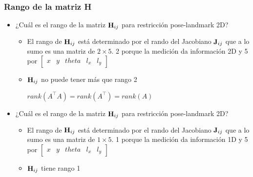 \begin{frame}
    \frametitle{Rango de la matriz H}
    \begin{itemize}
		\item ¿Cuál es el rango de la matriz $\boldsymbol{\mathbf{H}}_{ij}$ para restricción pose-landmark 2D?
		\begin{itemize}
			\item El rango de $\boldsymbol{\mathbf{H}}_{ij}$ está determinado por el rando del Jacobiano $\boldsymbol{\mathbf{J}}_{ij}$ que a lo sumo es una matriz de $2 \times 5$. 2 porque la medición da información 2D y 5 por $\begin{bmatrix}	x & y & theta & l_{x} & l_{y} \end{bmatrix}$
			\item $\boldsymbol{\mathbf{H}}_{ij}$ no puede tener más que rango 2
			
				$rank(A^{\top} A) = rank(A^{\top}) = rank(A)$
		\end{itemize}
	
		\item ¿Cuál es el rango de la matriz $\boldsymbol{\mathbf{H}}_{ij}$ para restricción pose-landmark 2D?
		\begin{itemize}
			\item El rango de $\boldsymbol{\mathbf{H}}_{ij}$ está determinado por el rando del Jacobiano $\boldsymbol{\mathbf{J}}_{ij}$ que a lo sumo es una matriz de $1 \times 5$. 1 porque la medición da información 1D y 5 por $\begin{bmatrix}	x & y & theta & l_{x} & l_{y} \end{bmatrix}$
			\item $\boldsymbol{\mathbf{H}}_{ij}$ tiene rango 1
		\end{itemize}
		
    \end{itemize}
\end{frame}

